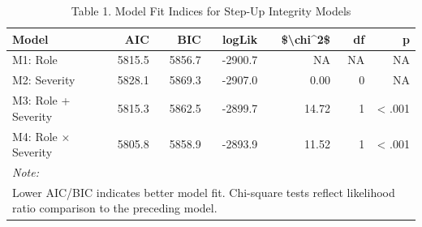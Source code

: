 \documentclass[
]{article}
\begin{document}
\begin{longtable}[t]{lrrrrrr}
\caption{\label{tab:unnamed-chunk-19}Table 1. Model Fit Indices for Step-Up Integrity Models}\\
\toprule
Model & AIC & BIC & logLik & \$\textbackslash{}chi\textasciicircum{}2\$ & df & p\\
\midrule
M1: Role & 5815.5 & 5856.7 & -2900.7 & NA & NA & NA\\
M2: Severity & 5828.1 & 5869.3 & -2907.0 & 0.00 & 0 & NA\\
M3: Role + Severity & 5815.3 & 5862.5 & -2899.7 & 14.72 & 1 & < .001\\
M4: Role × Severity & 5805.8 & 5858.9 & -2893.9 & 11.52 & 1 & < .001\\
\bottomrule
\multicolumn{7}{l}{\rule{0pt}{1em}\textit{Note: }}\\
\multicolumn{7}{l}{\rule{0pt}{1em}Lower AIC/BIC indicates better model fit. Chi-square tests reflect likelihood ratio comparison to the preceding model.}\\
\end{longtable}
\end{document}
